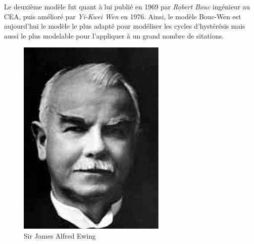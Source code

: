 \documentclass[11pt]{article}
\begin{document}
Le deuxième modèle fut quant à lui publié en 1969 par \textit{Robert Bouc} ingénieur au CEA, puis amélioré par 
\textit{Yi-Kwei Wen} en 1976. Ainsi, le modèle Bouc-Wen est aujourd'hui le modèle le plus adapté pour modéliser
les cycles d'hystérésis mais aussi le plus modelable pour l'appliquer à un grand nombre de sitations.

\begin{figure}[H]
    \centering
    \begin{minipage}{0.2\textwidth}
      \centering
      \includegraphics[width=\textwidth]{James_A_Ewing.jpg}
      \caption{Sir James Alfred Ewing}
    \end{minipage}
    \hspace{1in}
    \begin{minipage}{0.27\textwidth}
      \centering

\end{minipage}
\end{figure}
\end{document}
